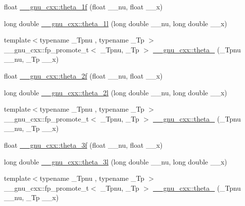 \begin{DoxyCompactItemize}
float \hyperlink{group__gnu__math__spec__func_ga5bbf256b875da28132f9049f5984cb14}{\+\_\+\+\_\+gnu\+\_\+cxx\+::theta\+\_\+1f} (float \+\_\+\+\_\+nu, float \+\_\+\+\_\+x)
\item 
long double \hyperlink{group__gnu__math__spec__func_ga3520684c78771ffa57180060c8b6d1ca}{\+\_\+\+\_\+gnu\+\_\+cxx\+::theta\+\_\+1l} (long double \+\_\+\+\_\+nu, long double \+\_\+\+\_\+x)
\item 
{\footnotesize template$<$typename \+\_\+\+Tpnu , typename \+\_\+\+Tp $>$ }\\\+\_\+\+\_\+gnu\+\_\+cxx\+::fp\+\_\+promote\+\_\+t$<$ \+\_\+\+Tpnu, \+\_\+\+Tp $>$ \hyperlink{group__gnu__math__spec__func_ga16f278edeb2842d614bae1f1ae2d0256}{\+\_\+\+\_\+gnu\+\_\+cxx\+::theta\+\_} (\+\_\+\+Tpnu \+\_\+\+\_\+nu, \+\_\+\+Tp \+\_\+\+\_\+x)
\item 
float \hyperlink{group__gnu__math__spec__func_ga78e832796aedf5159b142801e1184392}{\+\_\+\+\_\+gnu\+\_\+cxx\+::theta\+\_\+2f} (float \+\_\+\+\_\+nu, float \+\_\+\+\_\+x)
\item 
long double \hyperlink{group__gnu__math__spec__func_gac5a30c772d4888442665945e7f3fa017}{\+\_\+\+\_\+gnu\+\_\+cxx\+::theta\+\_\+2l} (long double \+\_\+\+\_\+nu, long double \+\_\+\+\_\+x)
\item 
{\footnotesize template$<$typename \+\_\+\+Tpnu , typename \+\_\+\+Tp $>$ }\\\+\_\+\+\_\+gnu\+\_\+cxx\+::fp\+\_\+promote\+\_\+t$<$ \+\_\+\+Tpnu, \+\_\+\+Tp $>$ \hyperlink{group__gnu__math__spec__func_ga146c3b8e86991e164d4bf143cda5f0fc}{\+\_\+\+\_\+gnu\+\_\+cxx\+::theta\+\_} (\+\_\+\+Tpnu \+\_\+\+\_\+nu, \+\_\+\+Tp \+\_\+\+\_\+x)
\item 
float \hyperlink{group__gnu__math__spec__func_ga9a7c967d2a456f1a6aceee9a53f024b1}{\+\_\+\+\_\+gnu\+\_\+cxx\+::theta\+\_\+3f} (float \+\_\+\+\_\+nu, float \+\_\+\+\_\+x)
\item 
long double \hyperlink{group__gnu__math__spec__func_gaf88874ff6c69940d2191f7947d2ea119}{\+\_\+\+\_\+gnu\+\_\+cxx\+::theta\+\_\+3l} (long double \+\_\+\+\_\+nu, long double \+\_\+\+\_\+x)
\item 
{\footnotesize template$<$typename \+\_\+\+Tpnu , typename \+\_\+\+Tp $>$ }\\\+\_\+\+\_\+gnu\+\_\+cxx\+::fp\+\_\+promote\+\_\+t$<$ \+\_\+\+Tpnu, \+\_\+\+Tp $>$ \hyperlink{group__gnu__math__spec__func_ga8a6f8b69272a9f205a13e1745832ada3}{\+\_\+\+\_\+gnu\+\_\+cxx\+::theta\+\_} (\+\_\+\+Tpnu \+\_\+\+\_\+nu, \+\_\+\+Tp \+\_\+\+\_\+x)
\item 

\end{DoxyCompactItemize}
